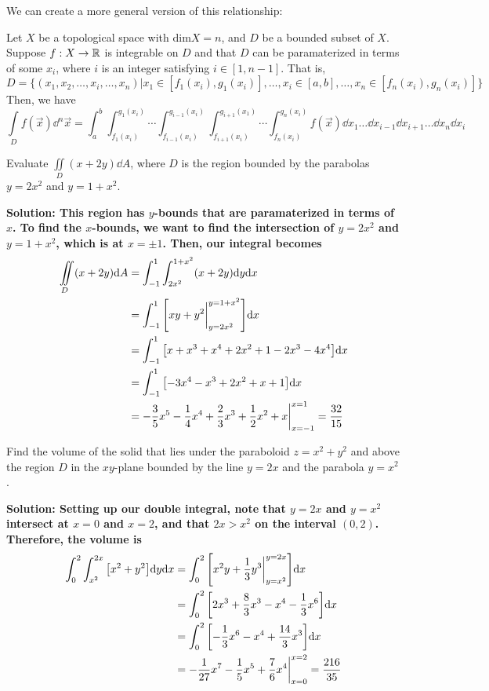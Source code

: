 We can create a more general version of this relationship:
\begin{theorem}
    Let \( X \) be a topological space with \( \text{dim}X = n \), and \( D \) be a bounded subset of \( X \). Suppose \( f: X\to \mathbb{R} \) is integrable on \( D \) and that \( D \) can be paramaterized in terms of some \( x_i \), where \( i \) is an integer satisfying \( i\in [1, n-1] \). That is,
    \[ D = \{(x_1, x_2, \dots, x_i, \dots, x_n)|x_1\in[f_1(x_i), g_1(x_i)], \dots, x_i\in[a, b],\dots,x_n\in[f_n(x_i), g_n(x_i)]\}\]
    Then, we have
    \[ \int\limits_Df(\vec x)\dd^n\vec x = \int_a^b\int_{f_1(x_i)}^{g_1(x_i)}\cdots\int_{f_{i-1}(x_i)}^{g_{i-1}(x_i)}\int_{f_{i+1}(x_i)}^{g_{i+1}(x_1)}\cdots \int_{f_n(x_i)}^{g_n(x_i)}f(\vec x)\dd x_1\dots\dd x_{i-1}\dd x_{i+1}\dots\dd x_n\dd x_i \]
\end{theorem}
\begin{example}
    Evaluate \( \iint\limits_D(x+2y)\dd A \), where \( D \) is the region bounded by the parabolas \( y=2x^2 \) and \( y=1+x^2 \).\par
    \bf{Solution: }This region has \( y \)-bounds that are paramaterized in terms of \( x \). To find the \( x \)-bounds, we want to find the intersection of \( y=2x^2 \) and \( y=1+x^2 \), which is at \( x=\pm 1 \). Then, our integral becomes
    \begin{align*}
        \iint\limits_D (x+2y)\dd A &= \int_{-1}^1\int_{2x^2}^{1+x^2}(x+2y)\dd y\dd x \\
        &= \int_{-1}^1\bqty{xy+y^2\biggr|_{y=2x^2}^{y=1+x^2}}\dd x \\
        &= \int_{-1}^1\bqty{x+x^3+x^4+2x^2+1-2x^3-4x^4}\dd x \\
        &= \int_{-1}^1\bqty{-3x^4 - x^3 + 2x^2 +x + 1}\dd x \\
        &= -\frac{3}{5}x^5-\frac{1}{4}x^4+\frac{2}{3}x^3+\frac{1}{2}x^2+x\biggr|_{x=-1}^{x=1} = \frac{32}{15}
    \end{align*}
\end{example}
\begin{example}
    Find the volume of the solid that lies under the paraboloid \( z=x^2+y^2 \) and above the region \( D \) in the \( xy \)-plane bounded by the line \( y=2x \) and the parabola \( y=x^2 \). \par \bf{Solution: }
    Setting up our double integral, note that \( y=2x \) and \( y=x^2 \) intersect at \( x=0 \) and \( x=2 \), and that \( 2x>x^2 \) on the interval \( (0,2) \). Therefore, the volume is 
    \begin{align*}
        \int_0^2\int_{x^2}^{2x}\bqty{x^2+y^2}\dd y\dd x &= \int_0^2\bqty{x^2y+\frac{1}{3}y^3\biggr|_{y=x^2}^{y=2x}}\dd x \\
        &= \int_0^2 \bqty{2x^3+\frac{8}{3}x^3-x^4-\frac{1}{3}x^6}\dd x \\
        &= \int_0^2 \bqty{-\frac{1}{3}x^6-x^4+\frac{14}{3}x^3}\dd x \\
        &= -\frac{1}{27}x^7-\frac{1}{5}x^5+\frac{7}{6}x^4\biggr|_{x=0}^{x=2}  = \frac{216}{35}
    \end{align*}
\end{example}
